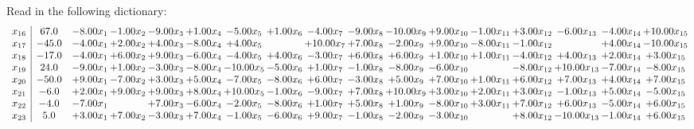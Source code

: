 \documentclass[9pt]{article}
\begin{document}
Read in the following dictionary:
\[\begin{array}{c| c c@{\hskip 2pt} c@{\hskip 2pt} c@{\hskip 2pt} c@{\hskip 2pt} c@{\hskip 2pt} c@{\hskip 2pt} c@{\hskip 2pt} c@{\hskip 2pt} c@{\hskip 2pt} c@{\hskip 2pt} c@{\hskip 2pt} c@{\hskip 2pt} c@{\hskip 2pt} c@{\hskip 2pt} c@{\hskip 2pt} }
 x_{16}   &  67.0 & -8.00 x_{1} & -1.00 x_{2} & -9.00 x_{3} & +  1.00 x_{4} & -5.00 x_{5} & +  1.00 x_{6} & -4.00 x_{7} & -9.00 x_{8} & -10.00 x_{9} & +  9.00 x_{10} & -1.00 x_{11} & +  3.00 x_{12} & -6.00 x_{13} & -4.00 x_{14} & + 10.00 x_{15}\\
 x_{17}   &  -45.0 & -4.00 x_{1} & +  2.00 x_{2} & +  4.00 x_{3} & -8.00 x_{4} & +  4.00 x_{5} &   & + 10.00 x_{7} & +  7.00 x_{8} & -2.00 x_{9} & +  9.00 x_{10} & -8.00 x_{11} & -1.00 x_{12} &   & +  4.00 x_{14} & -10.00 x_{15}\\
 x_{18}   &  -17.0 & -4.00 x_{1} & +  6.00 x_{2} & +  9.00 x_{3} & -6.00 x_{4} & -4.00 x_{5} & +  4.00 x_{6} & -3.00 x_{7} & +  6.00 x_{8} & +  6.00 x_{9} & +  1.00 x_{10} & +  1.00 x_{11} & -4.00 x_{12} & +  4.00 x_{13} & +  2.00 x_{14} & +  3.00 x_{15}\\
 x_{19}   &  24.0 & -9.00 x_{1} & +  1.00 x_{2} & -3.00 x_{3} & -8.00 x_{4} & -10.00 x_{5} & -5.00 x_{6} & +  1.00 x_{7} & -1.00 x_{8} & -8.00 x_{9} & -6.00 x_{10} &   & -8.00 x_{12} & + 10.00 x_{13} & -7.00 x_{14} & -8.00 x_{15}\\
 x_{20}   &  -50.0 & +  9.00 x_{1} & -7.00 x_{2} & +  3.00 x_{3} & +  5.00 x_{4} & -7.00 x_{5} & -8.00 x_{6} & +  6.00 x_{7} & -3.00 x_{8} & +  5.00 x_{9} & +  7.00 x_{10} & +  1.00 x_{11} & +  6.00 x_{12} & +  7.00 x_{13} & +  4.00 x_{14} & +  7.00 x_{15}\\
 x_{21}   &  -6.0 & +  2.00 x_{1} & +  9.00 x_{2} & +  9.00 x_{3} & +  8.00 x_{4} & + 10.00 x_{5} & -1.00 x_{6} & -9.00 x_{7} & +  7.00 x_{8} & + 10.00 x_{9} & +  3.00 x_{10} & +  2.00 x_{11} & +  3.00 x_{12} & -1.00 x_{13} & +  5.00 x_{14} & -5.00 x_{15}\\
 x_{22}   &  -4.0 & -7.00 x_{1} &   & +  7.00 x_{3} & -6.00 x_{4} & -2.00 x_{5} & -8.00 x_{6} & +  1.00 x_{7} & +  5.00 x_{8} & +  1.00 x_{9} & -8.00 x_{10} & +  3.00 x_{11} & +  7.00 x_{12} & +  6.00 x_{13} & -5.00 x_{14} & +  6.00 x_{15}\\
 x_{23}   &  5.0 & +  3.00 x_{1} & +  7.00 x_{2} & -3.00 x_{3} & +  7.00 x_{4} & -1.00 x_{5} & -6.00 x_{6} & +  9.00 x_{7} & -1.00 x_{8} & -2.00 x_{9} & -3.00 x_{10} &   & +  8.00 x_{12} & -10.00 x_{13} & -1.00 x_{14} & +  6.00 x_{15}\\

\end{array}\]
\end{document}
